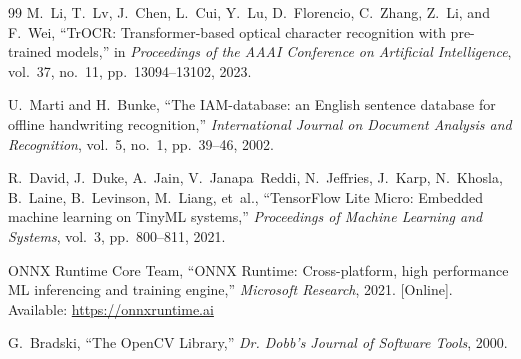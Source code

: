 \documentclass[11pt,a4paper]{article}
\begin{document}
\begin{thebibliography}{99}
M.~Li, T.~Lv, J.~Chen, L.~Cui, Y.~Lu, D.~Florencio, C.~Zhang, Z.~Li, and F.~Wei,
``TrOCR: Transformer-based optical character recognition with pre-trained models,''
in \emph{Proceedings of the AAAI Conference on Artificial Intelligence}, vol.~37, no.~11, pp.~13094--13102, 2023.

U.~Marti and H.~Bunke,
``The IAM-database: an English sentence database for offline handwriting recognition,''
\emph{International Journal on Document Analysis and Recognition}, vol.~5, no.~1, pp.~39--46, 2002.

R.~David, J.~Duke, A.~Jain, V.~Janapa~Reddi, N.~Jeffries, J.~Karp, N.~Khosla, B.~Laine, B.~Levinson, M.~Liang, et~al.,
``TensorFlow Lite Micro: Embedded machine learning on TinyML systems,''
\emph{Proceedings of Machine Learning and Systems}, vol.~3, pp.~800--811, 2021.

ONNX Runtime Core Team,
``ONNX Runtime: Cross-platform, high performance ML inferencing and training engine,''
\emph{Microsoft Research}, 2021. [Online]. Available: \url{https://onnxruntime.ai}

G.~Bradski,
``The OpenCV Library,''
\emph{Dr. Dobb's Journal of Software Tools}, 2000.

\end{thebibliography}
\end{document}
